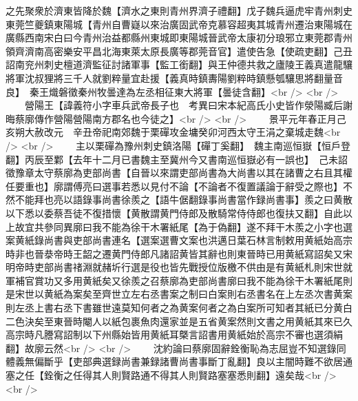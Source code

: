 之先聚衆於濟東皆降於魏【濟水之東則青州界濟子禮翻】戊子魏兵逼虎牢青州刺史東莞竺夔鎮東陽城【青州自曹嶷以來治廣固武帝克慕容超夷其城青州遷治東陽城在廣縣西南宋白曰今青州治益都縣州東城即東陽城晉武帝太康初分琅邪立東莞郡青州領齊濟南高密樂安平昌北海東萊太原長廣等郡莞音官】遣使告急【使疏吏翻】己丑詔南兖州刺史檀道濟監征討諸軍事【監工銜翻】與王仲德共救之廬陵王義真遣龍驤將軍沈叔狸將三千人就劉粹量宜赴援【義真時鎮夀陽劉粹時鎮懸瓠驤思將翻量音良】　秦王熾磐徵秦州牧曇達為左丞相征東大將軍【曇徒含翻】<br />
<br />
　　營陽王【諱義符小字車兵武帝長子也　考異曰宋本紀高氏小史皆作滎陽臧后謝晦蔡廓傳作營陽營陽南方郡名也今徒之】<br />
<br />
　　景平元年春正月己亥朔大赦改元　辛丑帝祀南郊魏于栗磾攻金墉癸卯河西太守王涓之棄城走魏<br />
<br />
　　主以栗磾為豫州刺史鎮洛陽【磾丁奚翻】　魏主南巡恒嶽【恒戶登翻】丙辰至鄴【去年十二月已書魏主至冀州今又書南巡恒嶽必有一誤也】　己未詔徵豫章太守蔡廓為吏部尚書【自晉以來謂吏部尚書為大尚書以其在諸曹之右且其權任要重也】廓謂傅亮曰選事若悉以見付不論【不論者不復置議論于辭受之際也】不然不能拜也亮以語錄事尚書徐羨之【語牛倨翻錄事尚書當作録尚書事】羨之曰黄散以下悉以委蔡吾徒不復措懷【黄散謂黄門侍郎及散騎常侍侍郎也復扶又翻】自此以上故宜共參同異廓曰我不能為徐干木署紙尾【為于偽翻】遂不拜干木羨之小字也選案黄紙錄尚書與吏部尚書連名【選案選曹文案也洪邁日葉石林言制敕用黄紙始高宗時非也晉㳟帝時王韶之遷黄門侍郎凡諸詔黄皆其辭也則東晉時已用黄紙寫詔矣又宋明帝時吏部尚書禇淵就赭圻行選是役也皆先戰授位版檄不供由是有黄紙札則宋世就軍補官賞功又多用黄紙矣又徐羨之召蔡廓為吏部尚書廓曰我不能為徐干木署紙尾則是宋世以黄紙為案矣至齊世立左右丞書案之制曰白案則右丞書名在上左丞次書黄案則左丞上書右丞下書雖世遠莫知何者之為黄案何者之為白案所可知者其紙已分黄白二色決矣至東晉時閹人以紙包裹魚肉還家並是五省黄案然則文書之用黄紙其來已久高宗時凡謄寫詔制以下州縣始皆用黄紙耳槩言詔書用黄紙始於高宗不審也選須絹翻】故廓云然<br />
<br />
　　沈約論曰蔡廓固辭銓衡恥為志屈豈不知選錄同體義無偏斷乎【吏部典選録尚書兼録諸曹尚書事斷丁亂翻】良以主闇時難不欲居通塞之任【銓衡之任得其人則賢路通不得其人則賢路塞塞悉則翻】遠矣哉<br />
<br />
